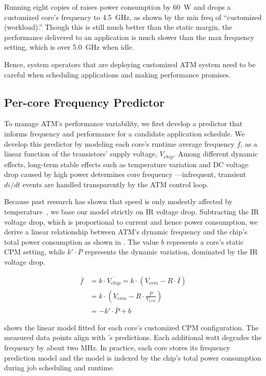 Running eight copies of  raises power consumption by 60~W and drops a customized core's frequency to 4.5~GHz, as shown by the min freq of ``customized (workload).'' Though this is still much better than the static margin, the performance delivered to an application is much slower than the max frequency setting, which is over 5.0~GHz when idle. 

Hence, system operators that are deploying customized ATM system need to be careful when scheduling applications and making performance promises.


\subsection{Per-core Frequency Predictor}
\label{sec:process:schedule:predict}

To manage ATM's performance variability, we first develop a predictor that informs frequency and performance for a candidate application schedule. We develop this predictor by modeling each core's runtime average frequency $\overline{f}$, as a linear function of the transistors' supply voltage, $V_{chip}$. Among different dynamic effects, long-term stable effects such as temperature variation and DC voltage drop caused by high power determines core frequency ---infrequent, transient $di/dt$ events are handled transparently by the ATM control loop. 

Because past research has shown that speed is only modestly affected by temperature~\cite{zu2016tistate}, we base our model strictly on IR voltage drop. Subtracting the IR voltage drop, which is proportional to current and hence power consumption, we derive a linear relationship between ATM's dynamic frequency and the chip's total power consumption as shown in  . The value $b$ represents a core's static CPM setting, while $k' \cdot \overline{P}$ represents the dynamic variation, dominated by the IR voltage drop. 

\begin{equation}\label{eq:freq-pred}
\begin{split}
\overline{f} &= k \cdot \overline{V_{chip}} = k \cdot (V_{vrm} - R \cdot \overline{I})\\
&= k \cdot (V_{vrm} - R \cdot \frac{\overline{P}}{V_{vrm}})\\
&= -k' \cdot \overline{P} + b
\end{split}
\end{equation}

 shows the linear model fitted for each core's customized CPM configuration. The measured data points align with 's predictions. Each additional watt degrades the frequency by about two MHz. In practice, each core stores its frequency prediction model and the model is indexed by the chip's total power consumption during job scheduling and runtime.



